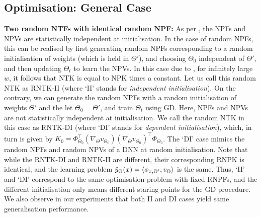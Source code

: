 \subsection{Optimisation: General Case}
\textbf{Two random NTFs with identical random NPF:} As per , the NPFs and NPVs are statistically independent at initialisation. In the case of random NPFs, this can be realised by first generating random NPFs corresponding to a random initialisation of weights (which is held in $\Theta'$), and  choosing $\Theta_0$ independent of $\Theta'$, and then updating $\Theta_t$ to learn the NPVs. In this case due to , for infinitely large $w$, it follows that NTK is equal to NPK times a constant. Let us call this random NTK as RNTK-II (where `II' stands for \emph{independent initialisation}). On the contrary, we can generate the random NPFs with a random initialisation of weights $\Theta'$ and the let $\Theta_0=\Theta'$, and train $\Theta_t$ using GD. Here, NPFs and NPVs are not statistically independent at initialisation. We call the random NTK in this case as RNTK-DI (where `DI' stands for \emph{dependent initialisation}), which, in turn is given by $K_0=\Phi^\top_{\Theta_0}(\nabla_{\Theta} v_{\Theta_0})(\nabla_{\Theta} v_{\Theta_0})^\top \Phi_{\Theta_0}$. The `DI' case mimics the random NPFs and random NPVs of a DNN at random initialisation. Note that while the RNTK-DI and RNTK-II are different, their corresponding RNPK is identical, and the learning problem $\hat{y}_{\Theta}(x)=\langle \phi_{x,\Theta'},v_{\Theta}\rangle$ is the same. Thus, `II' and `DI' correspond to the same optimisation problem with fixed RNPFs, and the different initialisation only means different staring points for the GD procedure.  We also observe in our experiments that both II and DI cases yield same generalisation performance. 
\FloatBarrier
